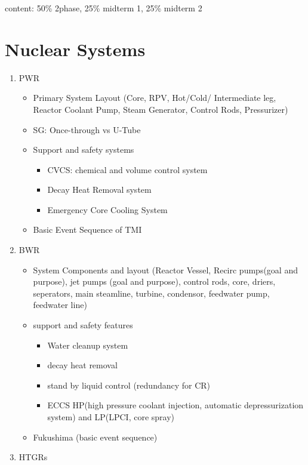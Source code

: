 \documentclass{article}
\begin{document}
content: 50\% 2phase, 25\% midterm 1, 25\% midterm 2

\section{Nuclear Systems}
\begin{enumerate}
    \item PWR
    \begin{itemize}
        \item Primary System Layout (Core, RPV, Hot/Cold/ Intermediate leg, Reactor Coolant Pump, Steam Generator, Control Rods, Pressurizer)
        \item SG: Once-through vs U-Tube
        \item Support and safety systems
        \begin{itemize}
            \item CVCS: chemical and volume control system
            \item Decay Heat Removal system
            \item Emergency Core Cooling System
        \end{itemize}
        \item Basic Event Sequence of TMI
    \end{itemize}
    \item BWR
    \begin{itemize}
        \item System Components and layout (Reactor Vessel, Recirc pumps(goal and purpose), jet pumps (goal and purpose), control rods, core, driers, seperators, main steamline, turbine, condensor, feedwater pump, feedwater line)
        \item support and safety features
        \begin{itemize}
            \item Water cleanup system 
            \item decay heat removal
            \item stand by liquid control (redundancy for CR)
            \item ECCS HP(high pressure coolant injection, automatic depressurization system) and LP(LPCI, core spray)
        \end{itemize}
        \item Fukushima (basic event sequence)
    \end{itemize}
    \item HTGRs
    \begin{itemize}

\end{itemize}
\end{enumerate}
\end{document}
